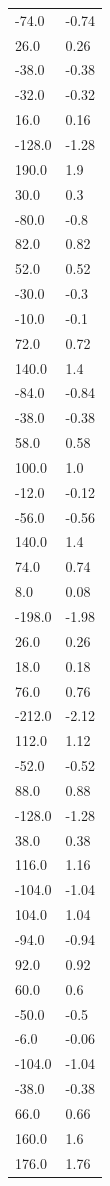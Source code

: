 \begin{longtable}{ll}
-74.0 & -0.74 \\
26.0 & 0.26 \\
-38.0 & -0.38 \\
-32.0 & -0.32 \\
16.0 & 0.16 \\
-128.0 & -1.28 \\
190.0 & 1.9 \\
30.0 & 0.3 \\
-80.0 & -0.8 \\
82.0 & 0.82 \\
52.0 & 0.52 \\
-30.0 & -0.3 \\
-10.0 & -0.1 \\
72.0 & 0.72 \\
140.0 & 1.4 \\
-84.0 & -0.84 \\
-38.0 & -0.38 \\
58.0 & 0.58 \\
100.0 & 1.0 \\
-12.0 & -0.12 \\
-56.0 & -0.56 \\
140.0 & 1.4 \\
74.0 & 0.74 \\
8.0 & 0.08 \\
-198.0 & -1.98 \\
26.0 & 0.26 \\
18.0 & 0.18 \\
76.0 & 0.76 \\
-212.0 & -2.12 \\
112.0 & 1.12 \\
-52.0 & -0.52 \\
88.0 & 0.88 \\
-128.0 & -1.28 \\
38.0 & 0.38 \\
116.0 & 1.16 \\
-104.0 & -1.04 \\
104.0 & 1.04 \\
-94.0 & -0.94 \\
92.0 & 0.92 \\
60.0 & 0.6 \\
-50.0 & -0.5 \\
-6.0 & -0.06 \\
-104.0 & -1.04 \\
-38.0 & -0.38 \\
66.0 & 0.66 \\
160.0 & 1.6 \\
176.0 & 1.76 \\

\end{longtable}

